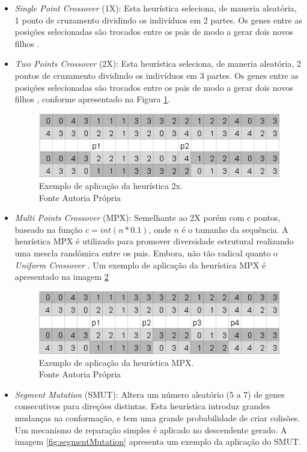  \begin{itemize}
 	
 		\item \textit{Single Point Crossover} (1X): Esta heurística seleciona, de maneria aleatória, 1 ponto de cruzamento dividindo os indivíduos em 2 partes. Os genes entre as posições selecionadas são trocados entre os pais de modo a gerar dois novos filhos \cite{benitez2015algoritmo}.
 	
 	\item \textit{Two Points Crossover} (2X): Esta heurística seleciona, de maneria aleatória, 2 pontos de cruzamento dividindo os indivíduos em 3 partes. Os genes entre as posições selecionadas são trocados entre os pais de modo a gerar dois novos filhos \cite{benitez2015algoritmo}, conforme apresentado na Figura \ref{fig:twopointscrossover}.
 	
 	
 	\begin{figure}[!htb]
 		\centering
 		\includegraphics{Imagens/TwoPointsCrossover.png}
 		\caption{Exemplo de aplicação da heurística 2x. \\Fonte Autoria Própria}
 		\label{fig:twopointscrossover}
 	\end{figure}
 	
 	
 	
 	
 	\item \textit{Multi Points Crossover} (MPX): Semelhante ao 2X porém com c pontos, baseado na função $c = int(n * 0.1)$, onde $n$ é o tamanho da sequência. A heurística MPX é utilizado para promover diversidade estrutural realizando uma mescla randômica entre os pais. Embora, não tão radical quanto o \textit{Uniform  Crossover} \cite{sabar2015automatic}. Um exemplo de aplicação da heurística MPX é apresentado na imagem \ref{fig:multipointscrossover}
 	
 	
 	\begin{figure}[!htb]
 		\centering
 		\includegraphics{Imagens/MultiPointsCrossover.png}
 		\caption{Exemplo de aplicação da heurística MPX. \\Fonte Autoria Própria}
 		\label{fig:multipointscrossover}
 	\end{figure}
 	\item \textit{Segment Mutation} (SMUT): Altera um número aleatório (5 a 7) de genes consecutivos para direções distintas. Esta heurística introduz grandes mudanças na conformação, e tem uma grande probabilidade de criar colisões. Um mecanismo de reparação simples é aplicado no descendente gerado. A imagem \ref{fig:segmentMutation} apresenta um exemplo da aplicação do SMUT.
 	

\end{itemize}
